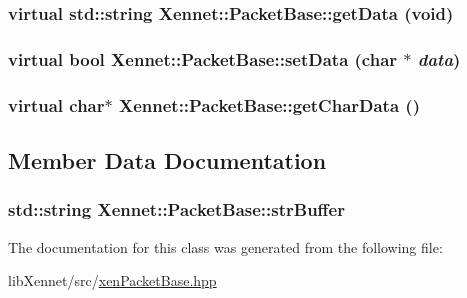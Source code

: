 \hypertarget{classXennet_1_1PacketBase_01c2e74a25df5fcf0e287c97b9a766c2}{
\subsubsection{\setlength{\rightskip}{0pt plus 5cm}virtual std::string Xennet::PacketBase::getData (void)}}
\label{classXennet_1_1PacketBase_01c2e74a25df5fcf0e287c97b9a766c2}


\hypertarget{classXennet_1_1PacketBase_c2108b4190c783012d9771fab0c6d856}{
\subsubsection{\setlength{\rightskip}{0pt plus 5cm}virtual bool Xennet::PacketBase::setData (char $\ast$ {\em data})}}
\label{classXennet_1_1PacketBase_c2108b4190c783012d9771fab0c6d856}


\hypertarget{classXennet_1_1PacketBase_63902a287597beab0a918b0643b35dc6}{
\subsubsection{\setlength{\rightskip}{0pt plus 5cm}virtual char$\ast$ Xennet::PacketBase::getCharData ()}}
\label{classXennet_1_1PacketBase_63902a287597beab0a918b0643b35dc6}




\subsection{Member Data Documentation}
\hypertarget{classXennet_1_1PacketBase_e9a2adcaac12840f617f23de231519d3}{
\subsubsection{\setlength{\rightskip}{0pt plus 5cm}std::string {\bf Xennet::PacketBase::strBuffer}}}
\label{classXennet_1_1PacketBase_e9a2adcaac12840f617f23de231519d3}




The documentation for this class was generated from the following file:\begin{CompactItemize}
\item 
libXennet/src/\hyperlink{xenPacketBase_8hpp}{xenPacketBase.hpp}\end{CompactItemize}
